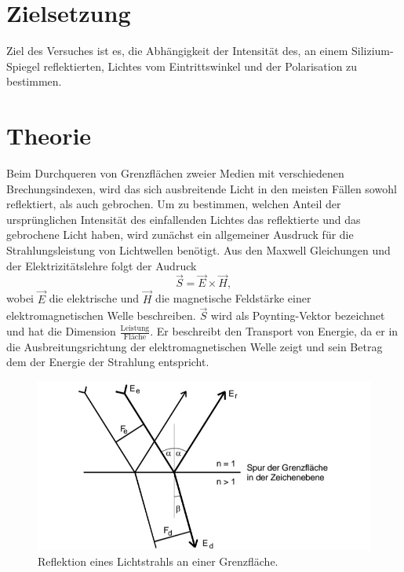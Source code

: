 \section{Zielsetzung}
\label{sec:Zielsetzung}

Ziel des Versuches ist es, die Abhängigkeit der Intensität des, an einem Silizium-Spiegel reflektierten, Lichtes vom Eintrittswinkel und der Polarisation zu bestimmen. 

\section{Theorie}
\label{sec:Theorie}

Beim Durchqueren von Grenzflächen zweier Medien mit verschiedenen Brechungsindexen, wird das sich ausbreitende Licht in den meisten Fällen sowohl reflektiert, als
auch gebrochen. Um zu bestimmen, welchen Anteil der ursprünglichen Intensität des einfallenden Lichtes das reflektierte und das gebrochene Licht haben, wird
zunächst ein allgemeiner Ausdruck für die Strahlungsleistung von Lichtwellen benötigt.
\newline
Aus den Maxwell Gleichungen und der Elektrizitätslehre folgt der Audruck 
\begin{equation}
    \vec{S} = \vec{E} \times \vec{H},
\end{equation}
wobei $\vec{E}$ die elektrische und $\vec{H}$ die magnetische Feldstärke einer elektromagnetischen Welle beschreiben. $\vec{S}$ wird als Poynting-Vektor bezeichnet
und hat die Dimension $\frac{\text{Leistung}}{\text{Fläche}}$. Er beschreibt den Transport von Energie, da er in die Ausbreitungsrichtung der elektromagnetischen
Welle zeigt und sein Betrag dem der Energie der Strahlung entspricht.

\begin{figure}[H]
	\centering
	\includegraphics[width=0.6\linewidth]{data/v407Brechung.jpg}
	\caption{Reflektion eines Lichtstrahls an einer Grenzfläche.\cite{Anleitung407}}
	\label{fig:brechung}
\end{figure}

